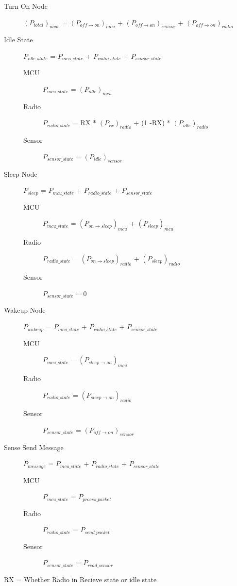 \documentclass{article}
\begin{document}
\begin{description}
	
	\item[Turn On Node] $(P_{total})_{node}$ = $(P_{off \to on})_{mcu}$ + $(P_{off \to on})_{sensor}$ + $(P_{off \to on})_{radio}$ 
	\item[Idle State] $P_{idle\_state}$ = $P_{mcu\_state}$ + $P_{radio\_state}$ + $P_{sensor\_state}$ \\
		\begin{description}
			\item[MCU] $P_{mcu\_state}$ = $(P_{idle})_{mcu} $
			\item[Radio] $P_{radio\_state}$ = RX * $(P_{rx})_{radio}$ + (1 -RX) * $(P_{idle})_{radio}$
			\item[Sensor] $P_{sensor\_state}$ = $(P_{idle})_{sensor} $
		\end{description}
	\item[Sleep Node] $P_{sleep}$ = $P_{mcu\_state}$ + $P_{radio\_state}$ + $P_{sensor\_state}$ \\
		\begin{description}
			\item[MCU] $P_{mcu\_state}$ = $(P_{on \to sleep})_{mcu}$ + $(P_{sleep})_{mcu}$
			\item[Radio] $P_{radio\_state}$ = $(P_{on \to sleep})_{radio}$ + $(P_{sleep})_{radio}$
			\item[Sensor] $P_{sensor\_state}$ = 0
		\end{description}
	\item[Wakeup Node] $P_{wakeup}$ = $P_{mcu\_state}$ + $P_{radio\_state}$ + $P_{sensor\_state}$ \\
		\begin{description}
			\item[MCU] $P_{mcu\_state}$ = $(P_{sleep \to on})_{mcu}$
			\item[Radio] $P_{radio\_state}$ = $(P_{sleep \to on})_{radio}$
			\item[Sensor] $P_{sensor\_state}$ = $(P_{off \to on})_{sensor}$
		\end{description}
	\item[Sense Send Message] $P_{message}$ = $P_{mcu\_state}$ + $P_{radio\_state}$ + $P_{sensor\_state}$ \\
		\begin{description}
			\item[MCU] $P_{mcu\_state}$ = $P_{procss\_packet}$
			\item[Radio] $P_{radio\_state}$ = $P_{send\_packet}$
			\item[Sensor] $P_{sensor\_state}$ = $P_{read\_sensor}$
		\end{description}
\end{description}

RX = Whether Radio in Recieve state or idle state
\end{document}
